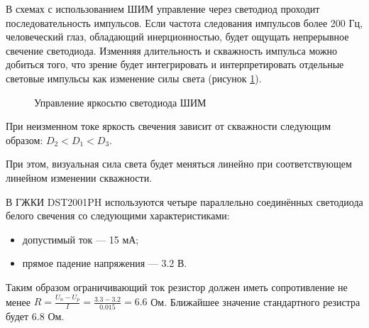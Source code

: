 В схемах с использованием ШИМ управление через светодиод проходит последовательность импульсов.
Если частота следования импульсов более 200 Гц, человеческий глаз, обладающий инерционностью,
будет ощущать непрерывное свечение светодиода. Изменняя длительность и скважность импульса
можно добиться того, что зрение будет интегрировать и интерпретировать отдельные световые
импульсы как изменение силы света (рисунок \ref{img:ledpwm}).


\begin{figure}[H]
	\caption{Управление яркосьтю светодиода ШИМ}
	\label{img:ledpwm}
\end{figure}


При неизменном токе яркость свечения зависит от скважности
следующим образом: $D_2 < D_1 < D_3$.

При этом, визуальная сила света будет меняться линейно при соответствующем
линейном изменении скважности.

В ГЖКИ DST2001PH используются четыре параллельно соединённых светодиода белого
свечения со следующими характеристиками:
\begin{itemize}
    \item{}допустимый ток --- 15 мА;
    \item{}прямое падение напряжения --- 3.2 В.
\end{itemize}

Таким образом ограничивающий ток резистор должен иметь сопротивление не менее
$R = \frac{U_n - U_p}{I} = \frac{3.3 - 3.2} {0.015} = 6.6$ Ом.
Ближайшее значение стандартного резистра будет 6.8 Ом.
